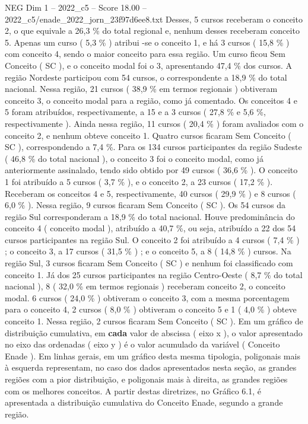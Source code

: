 \begin{textsample}{NEG Dim 1 – 2022\_c5 – Score 18.00 – 2022\_c5/enade\_2022\_jorn\_23f97d6ee8.txt}
Desses, 5 cursos receberam o conceito 2, o que equivale a 26,3 \% do total regional e, nenhum desses receberam conceito 5.
Apenas um curso ( 5,3 \% ) atribui -se o conceito 1, e há 3 cursos ( 15,8 \% ) com conceito 4, sendo o maior conceito para essa região.
Um curso ficou Sem Conceito ( SC ), e o conceito modal foi o 3, apresentando 47,4 \% dos cursos.
A região Nordeste participou com 54 cursos, o correspondente a 18,9 \% do total nacional.
Nessa região, 21 cursos ( 38,9 \% em termos regionais ) obtiveram conceito 3, o conceito modal para a região, como já comentado.
Os conceitos 4 e 5 foram atribuídos, respectivamente, a 15 e a 3 cursos ( 27,8 \% e 5,6 \%, respectivamente ).
Ainda nessa região, 11 cursos ( 20,4 \% ) foram avaliados com o conceito 2, e nenhum obteve conceito 1.
Quatro cursos ficaram Sem Conceito ( SC ), correspondendo a 7,4 \%.
Para os 134 cursos participantes da região Sudeste ( 46,8 \% do total nacional ), o conceito 3 foi o conceito modal, como já anteriormente assinalado, tendo sido obtido por 49 cursos ( 36,6 \% ).
O conceito 1 foi atribuído a 5 cursos ( 3,7 \% ), e o conceito 2, a 23 cursos ( 17,2 \% ).
Receberam os conceitos 4 e 5, respectivamente, 40 cursos ( 29,9 \% ) e 8 cursos ( 6,0 \% ).
Nessa região, 9 cursos ficaram Sem Conceito ( SC ).
Os 54 cursos da região Sul corresponderam a 18,9 \% do total nacional.
Houve predominância do conceito 4 ( conceito modal ), atribuído a 40,7 \%, ou seja, atribuído a 22 dos 54 cursos participantes na região Sul.
O conceito 2 foi atribuído a 4 cursos ( 7,4 \% ) ; o conceito 3, a 17 cursos ( 31,5 \% ) ; e o conceito 5, a 8 ( 14,8 \% ) cursos.
Na região Sul, 3 cursos ficaram Sem Conceito ( SC ) e nenhum foi classificado com conceito 1.
Já dos 25 cursos participantes na região Centro-Oeste ( 8,7 \% do total nacional ), 8 ( 32,0 \% em termos regionais ) receberam conceito 2, o conceito modal. 6 cursos ( 24,0 \% ) obtiveram o conceito 3, com a mesma porcentagem para o conceito 4, 2 cursos ( 8,0 \% ) obtiveram o conceito 5 e 1 ( 4,0 \% ) obteve conceito 1.
Nessa região, 2 cursos ficaram Sem Conceito ( SC ).
Em um gráfico de distribuição cumulativa, em \textbf{cada} valor de abscissa ( eixo x ), o valor apresentado no eixo das ordenadas ( eixo y ) é o valor acumulado da variável ( Conceito Enade ).
Em linhas gerais, em um gráfico desta mesma tipologia, poligonais mais à esquerda representam, no caso dos dados apresentados nesta seção, as grandes regiões com a pior distribuição, e poligonais mais à direita, as grandes regiões com os melhores conceitos.
A partir destas diretrizes, no Gráfico 6.1, é apresentada a distribuição cumulativa do Conceito Enade, segundo a grande região.

\end{textsample}
